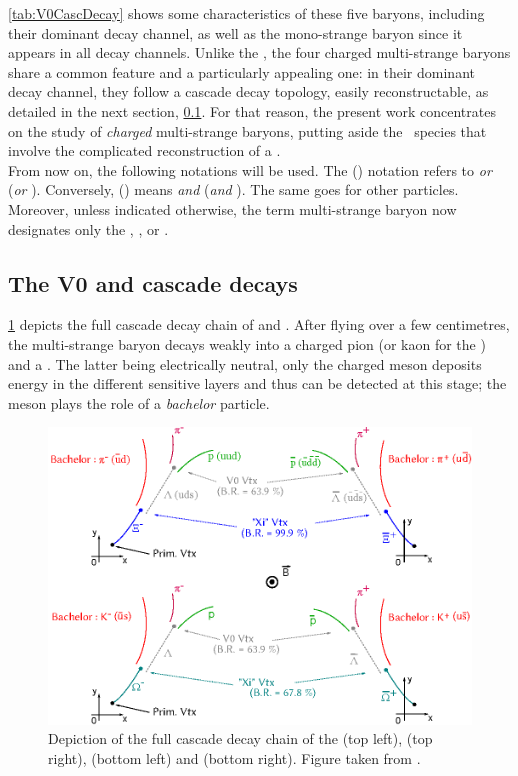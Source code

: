 \Tab\ref{tab:V0CascDecay} shows some characteristics of these five baryons, including their dominant decay channel, as well as the mono-strange baryon \rmLambda since it appears in all decay channels. Unlike the \rmXiZero, the four charged multi-strange baryons share a common feature and a particularly appealing one: in their dominant decay channel, they follow a cascade decay topology, easily reconstructable, as 
detailed in the next section, \Sec\ref{subsec:V0CascDecays}. For that reason, the present work concentrates on the study of \emph{charged} multi-strange baryons, \ie putting aside the \rmXiZero\ species that involve the complicated reconstruction of a \piZero.\\


From now on, the following notations will be used. The \rmXiPM (\rmOmegaPM) notation refers to \rmXiM \emph{or} \rmAxiP (\rmOmegaM \emph{or} \rmAomegaP). Conversely, \rmXi (\rmOmega) means \rmXiM \emph{and} \rmAxiP (\rmOmegaM \emph{and} \rmAomegaP). The same goes for other particles. Moreover, unless indicated otherwise, the term multi-strange baryon now designates only the \rmXiM, \rmAxiP, \rmOmegaM or \rmAomegaP.


\subsection{The V0 and cascade decays}
\label{subsec:V0CascDecays}


\Fig\ref{fig:CascadeDecay} depicts the full cascade decay chain of \rmXi and \rmOmega. After flying over a few centimetres, the multi-strange baryon decays weakly into a charged pion (or kaon for the \rmOmega) and a \rmLambda. The latter being electrically neutral, only the charged meson deposits energy in the different sensitive layers and thus can be detected at this stage; the meson plays the role of a \textit{bachelor} particle. 

\begin{figure}[t]
	\centering
	\includegraphics[width=1\textwidth]{Figs/Chapter4/Schema-4TypesDeCascade.eps}
	\caption{Depiction of the full cascade decay chain of the \rmXiM (top left), \rmAxiP (top right), \rmOmegaM (bottom left) and \rmAomegaP (bottom right). Figure taken from \cite{maireFourTypesCascade2011}.}
	\label{fig:CascadeDecay}
\end{figure}

